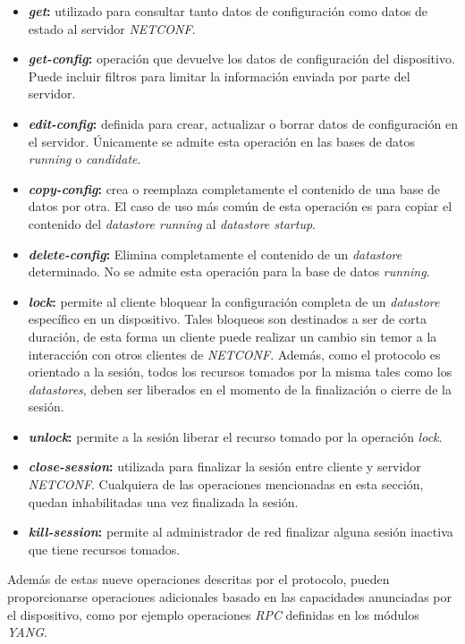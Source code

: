 \begin{itemize}
	\item \textbf{\textit{get}:} utilizado para consultar tanto datos de configuración como datos de estado al servidor \textit{NETCONF}.
	\item \textbf{\textit{get-config}:} operación que devuelve los datos de configuración del dispositivo. Puede incluir filtros para limitar la información enviada por parte del servidor.
	\item \textbf{\textit{edit-config}:} definida para crear, actualizar o borrar datos de configuración en el servidor. Únicamente se admite esta operación en las bases de datos \textit{running} o \textit{candidate}.
	\item \textbf{\textit{copy-config}:} crea o reemplaza completamente el contenido de una base de datos por otra. El caso de uso más común de esta operación es para copiar el contenido del \textit{datastore running} al \textit{datastore startup}. 
	\item \textbf{\textit{delete-config}:} Elimina completamente el contenido de un \textit{datastore} determinado. No se admite esta operación para la base de datos \textit{running}.
	\item \textbf{\textit{lock}:} permite al cliente bloquear la configuración completa de un \textit{datastore} específico en un dispositivo. Tales bloqueos son destinados a ser de corta duración, de esta forma un cliente puede realizar un cambio sin temor a la interacción con otros clientes de \textit{NETCONF}. Además, como el protocolo es orientado a la sesión, todos los recursos tomados por la misma tales como los \textit{datastores}, deben ser liberados en el momento de la finalización o cierre de la sesión.
	\item \textbf{\textit{unlock}:} permite a la sesión liberar el recurso tomado por la operación \textit{lock}.
	\item \textbf{\textit{close-session}:} utilizada para finalizar la sesión entre cliente y servidor \textit{NETCONF}. Cualquiera de las operaciones mencionadas en esta sección, quedan inhabilitadas una vez finalizada la sesión.
	\item \textbf{\textit{kill-session}:} permite al administrador de red finalizar alguna sesión inactiva que tiene recursos tomados. 
\end{itemize}

Además de estas nueve operaciones descritas por el protocolo, pueden proporcionarse operaciones adicionales basado en las capacidades anunciadas por el dispositivo, como por ejemplo operaciones \textit{RPC} definidas en los módulos \textit{YANG}.
\\

